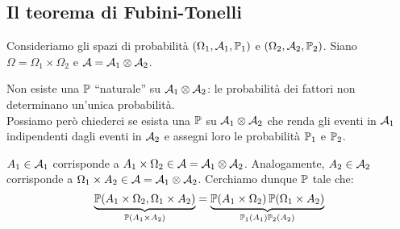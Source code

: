 \subsection{Il teorema di Fubini-Tonelli}
Consideriamo gli spazi di probabilità $(\Omega_1, \mathcal A_1, \mathbb P_1)$ e $(\Omega_2, \mathcal A_2, \mathbb P_2)$. Siano $\Omega=\Omega_1\times\Omega_2$ e $\mathcal A=\mathcal A_1\otimes\mathcal A_2$.

Non esiste una $\mathbb P$ ``naturale'' su $\mathcal A_1\otimes\mathcal A_2$: le probabilità dei fattori non determinano un'unica probabilità.\\
Possiamo però chiederci se esista una $\mathbb P$ su $\mathcal A_1\otimes\mathcal A_2$ che renda gli eventi in $\mathcal A_1$ indipendenti dagli eventi in $\mathcal A_2$ e assegni loro le probabilità $\mathbb P_1$ e $\mathbb P_2$.

$A_1 \in \mathcal A_1$ corrisponde a $A_1 \times \Omega_2 \in \mathcal A=\mathcal A_1\otimes\mathcal A_2$. Analogamente, $A_2 \in \mathcal A_2$ corrisponde a $ \Omega_1 \times A_2 \in \mathcal A=\mathcal A_1\otimes\mathcal A_2$. 
Cerchiamo dunque  $\mathbb P$ tale che:
$$\underbrace{ \mathbb P(A_1\times \Omega_2, \Omega_1 \times A_2) }_{\mathbb P(A_1\times A_2)}= \underbrace{ \mathbb P(A_1\times \Omega_2) \, \mathbb P(\Omega_1 \times A_2)}_{\mathbb P_1(A_1)\mathbb P_2(A_2)}$$

